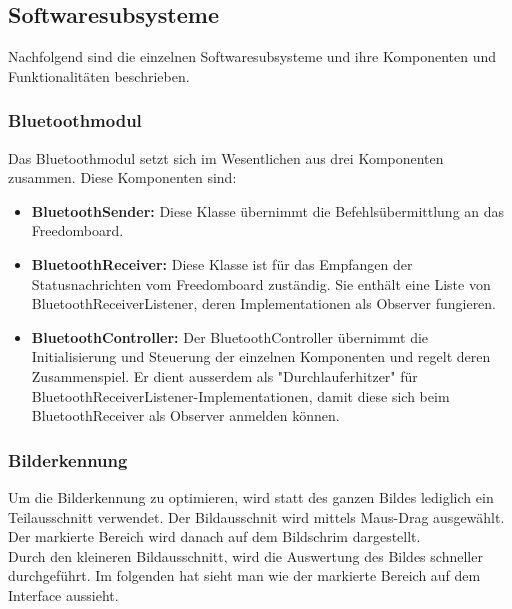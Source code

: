\subsection{Softwaresubsysteme}
Nachfolgend sind die einzelnen Softwaresubsysteme und ihre Komponenten und Funktionalitäten beschrieben.
\subsubsection{Bluetoothmodul}
Das Bluetoothmodul setzt sich im Wesentlichen aus drei Komponenten zusammen. Diese Komponenten sind:
\begin{itemize}
	\item{\textbf{BluetoothSender:} Diese Klasse übernimmt die Befehlsübermittlung an das Freedomboard.}
	\item{\textbf{BluetoothReceiver:} Diese Klasse ist für das Empfangen der Statusnachrichten vom Freedomboard zuständig. Sie enthält eine Liste von BluetoothReceiverListener, deren Implementationen als Observer fungieren.}
	\item{\textbf{BluetoothController:} Der BluetoothController übernimmt die Initialisierung und Steuerung der einzelnen Komponenten und regelt deren Zusammenspiel. Er dient ausserdem als "Durchlauferhitzer" für BluetoothReceiverListener-Implementationen, damit diese sich beim BluetoothReceiver als Observer anmelden können.}
\end{itemize}

\subsubsection{Bilderkennung}

Um die Bilderkennung zu optimieren, wird statt des ganzen Bildes lediglich ein Teilausschnitt verwendet.
Der Bildausschnit wird mittels Maus-Drag ausgewählt. Der markierte Bereich wird danach auf dem Bildschrim 
dargestellt. \\

Durch den kleineren Bildausschnitt, wird die Auswertung des Bildes schneller durchgeführt. Im folgenden hat
sieht man wie der markierte Bereich auf dem Interface aussieht.\\


